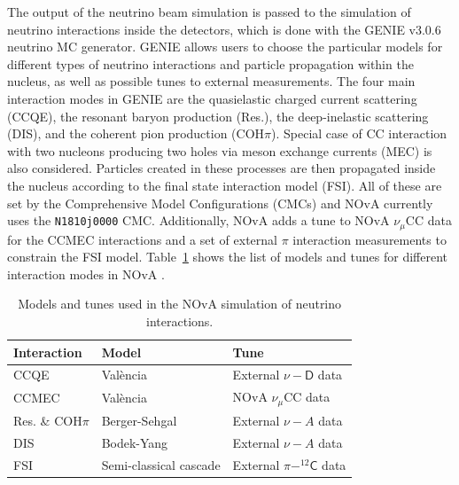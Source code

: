 
The output of the neutrino beam simulation is passed to the simulation of neutrino interactions inside the detectors, which is done with the GENIE v3.0.6~\cite{GENIE.pdf} neutrino MC generator. GENIE allows users to choose the particular models for different types of neutrino interactions and particle propagation within the nucleus, as well as possible tunes to external measurements. The four main interaction modes in GENIE are the quasielastic charged current scattering (CCQE), the resonant baryon production (Res.), the deep-inelastic scattering (DIS), and the coherent pion production (COH$\pi$). Special case of CC interaction with two nucleons producing two holes via meson exchange currents (MEC) is also considered. Particles created in these processes are then propagated inside the nucleus according to the final state interaction model (FSI). All of these are set by the Comprehensive Model Configurations (CMCs) and NOvA currently uses the \texttt{N1810j0000} CMC. Additionally, NOvA adds a tune to NOvA $\nu_\mu$CC data for the CCMEC interactions and a set of external $\pi$ interaction measurements to constrain the FSI model. Table~\ref{tab:NuIntSimulationModels} shows the list of models and tunes for different interaction modes in NOvA \cite{NOvAResults2021.pdf}.

\begin{table}[!ht]
\centering
\caption{Models and tunes used in the NOvA simulation of neutrino interactions.}
\begin{tabular}{|l|l|l|}
\hline
Interaction & Model                  & Tune\\\hline
CCQE & Val\`{e}ncia \cite{ValenciaModel_NOvACCQE_2004.pdf} & External $\nu-\textsf{D}$ data \cite{NuDeuteriumScattering_NOvACCQETune_2016.pdf}\\
CCMEC       & Val\`{e}ncia \cite{ValenciaModel_NOvACCQEMEC_2011.pdf,ValenciaModel_NOvAMEC_2013.pdf} & NOvA $\nu_\mu$CC data\\
Res. \& COH$\pi$ & Berger-Sehgal \cite{BergerSehgal_ResonancePionProd_2007.pdf,BergerSehgalModel_CohPionProd_2009.pdf}          & External $\nu-A$ data\\
DIS         & Bodek-Yang \cite{BodekYangModel_NOvADIS_2003.pdf,HadronizationModelForNuDIS_NOvADIS_1988.pdf}            & External $\nu-A$ data\\
FSI         & Semi-classical cascade \cite{FSIModel_hNSemiClassicalCascade_1988.pdf} & External $\pi-^{12}\textsf{C}$ data\\\hline
\end{tabular}
\label{tab:NuIntSimulationModels}
\end{table}

